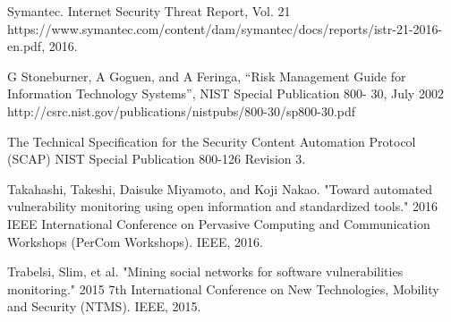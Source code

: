 \documentclass{llncs}
\begin{document}
\begin{thebibliography}{[MT1]}

%


Symantec. Internet Security Threat Report, Vol. 21 https://www.symantec.com/content/dam/symantec/docs/reports/istr-21-2016-en.pdf, 2016.

G Stoneburner, A Goguen, and A Feringa, “Risk Management Guide
for Information Technology Systems”, NIST Special Publication 800-
30, July 2002
http://csrc.nist.gov/publications/nistpubs/800-30/sp800-30.pdf

The Technical Specification for the
Security Content Automation Protocol (SCAP)
NIST Special Publication 800-126
Revision 3.

Takahashi, Takeshi, Daisuke Miyamoto, and Koji Nakao. "Toward automated vulnerability monitoring using open information and standardized tools." 2016 IEEE International Conference on Pervasive Computing and Communication Workshops (PerCom Workshops). IEEE, 2016.

Trabelsi, Slim, et al. "Mining social networks for software vulnerabilities monitoring." 2015 7th International Conference on New Technologies, Mobility and Security (NTMS). IEEE, 2015.
%
\end{thebibliography}
\end{document}
